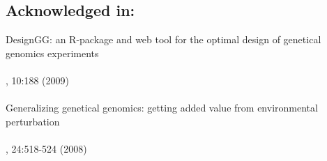 \subsection*{Acknowledged in:}
  DesignGG: an R-package and web tool for the optimal design of genetical genomics experiments\\
  \\
  , 10:188 (2009)\\\\
  Generalizing genetical genomics: getting added value from environmental perturbation\\
  \\
  , 24:518-524 (2008)

